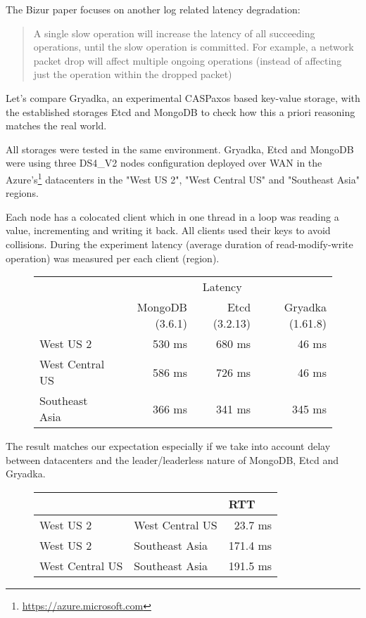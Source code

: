 \documentclass[12pt]{article}
\theoremstyle{definition}
\begin{document}
The Bizur paper focuses on another log related latency degradation:

\begin{quote}
A single slow operation will increase the latency of all succeeding operations, until the slow operation is committed. For example, a network packet drop will affect multiple ongoing operations (instead of affecting just the operation within the dropped packet)
\end{quote}

Let's compare Gryadka, an experimental CASPaxos based key-value storage, with the established storages Etcd and MongoDB to check how this a priori reasoning matches the real world.

All storages were tested in the same environment. Gryadka, Etcd and MongoDB were using three DS4\_V2 nodes configuration deployed over WAN in the Azure's\footnote{\href{https://azure.microsoft.com}{https://azure.microsoft.com}} datacenters in the "West US 2", "West Central US" and "Southeast Asia" regions.

Each node has a colocated client which in one thread in a loop was reading a value, incrementing and writing it back. All clients used their keys to avoid collisions. During the experiment latency (average duration of read-modify-write operation) was measured per each client (region).

\begin{figure}[!htb]
  \centering
  \begin{tabular}{c|r|r|r|}
  \cline{2-4}
  & \multicolumn{3}{|c|}{Latency} \\
  \cline{2-4}
  & MongoDB (3.6.1) & Etcd (3.2.13) & Gryadka (1.61.8) \\
  \hline
  \multicolumn{1}{|l|}{West US 2} & 530 ms & 680 ms & 46 ms \\
  \hline
  \multicolumn{1}{|l|}{West Central US} & 586 ms & 726 ms & 46 ms \\
  \hline
  \multicolumn{1}{|l|}{Southeast Asia} & 366 ms & 341 ms & 345 ms \\
  \hline
  \end{tabular}
\end{figure}

The result matches our expectation especially if we take into account delay between datacenters and the leader/leaderless nature of MongoDB, Etcd and Gryadka.

\begin{figure}[!h]
  \centering
  \begin{tabular}{llr|}
  \cline{3-3}
  & & \multicolumn{1}{|l|}{RTT} \\
  \hline
  \multicolumn{1}{|l|}{West US 2} & \multicolumn{1}{|l|}{West Central US} & 23.7 ms\\
  \hline
  \multicolumn{1}{|l|}{West US 2} & \multicolumn{1}{|l|}{Southeast Asia} & 171.4 ms\\
  \hline
  \multicolumn{1}{|l|}{West Central US} & \multicolumn{1}{|l|}{Southeast Asia} & 191.5 ms\\
  \hline
  \end{tabular}
\end{figure}
\end{document}
